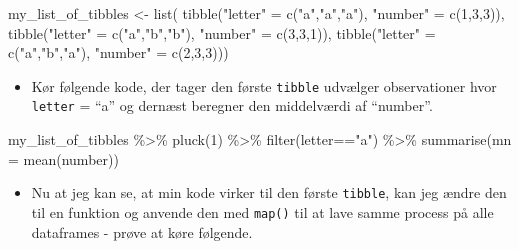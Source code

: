 \documentclass[
]{book}
\newenvironment{Shaded}{\begin{snugshade}}{\end{snugshade}}
\newcommand{\AttributeTok}[1]{\textcolor[rgb]{0.77,0.63,0.00}{#1}}
\newcommand{\DecValTok}[1]{\textcolor[rgb]{0.00,0.00,0.81}{#1}}
\newcommand{\FunctionTok}[1]{\textcolor[rgb]{0.00,0.00,0.00}{#1}}
\newcommand{\NormalTok}[1]{#1}
\newcommand{\OtherTok}[1]{\textcolor[rgb]{0.56,0.35,0.01}{#1}}
\newcommand{\SpecialCharTok}[1]{\textcolor[rgb]{0.00,0.00,0.00}{#1}}
\newcommand{\StringTok}[1]{\textcolor[rgb]{0.31,0.60,0.02}{#1}}
\providecommand{\tightlist}{%
  \setlength{\itemsep}{0pt}\setlength{\parskip}{0pt}}
\begin{document}
\begin{Shaded}
\begin{Highlighting}[]
\NormalTok{my\_list\_of\_tibbles }\OtherTok{\textless{}{-}} \FunctionTok{list}\NormalTok{( }\FunctionTok{tibble}\NormalTok{(}\StringTok{"letter"} \OtherTok{=} \FunctionTok{c}\NormalTok{(}\StringTok{"a"}\NormalTok{,}\StringTok{"a"}\NormalTok{,}\StringTok{"a"}\NormalTok{), }\StringTok{"number"} \OtherTok{=} \FunctionTok{c}\NormalTok{(}\DecValTok{1}\NormalTok{,}\DecValTok{3}\NormalTok{,}\DecValTok{3}\NormalTok{)),}
                            \FunctionTok{tibble}\NormalTok{(}\StringTok{"letter"} \OtherTok{=} \FunctionTok{c}\NormalTok{(}\StringTok{"a"}\NormalTok{,}\StringTok{"b"}\NormalTok{,}\StringTok{"b"}\NormalTok{), }\StringTok{"number"} \OtherTok{=} \FunctionTok{c}\NormalTok{(}\DecValTok{3}\NormalTok{,}\DecValTok{3}\NormalTok{,}\DecValTok{1}\NormalTok{)),}
                            \FunctionTok{tibble}\NormalTok{(}\StringTok{"letter"} \OtherTok{=} \FunctionTok{c}\NormalTok{(}\StringTok{"a"}\NormalTok{,}\StringTok{"b"}\NormalTok{,}\StringTok{"a"}\NormalTok{), }\StringTok{"number"} \OtherTok{=} \FunctionTok{c}\NormalTok{(}\DecValTok{2}\NormalTok{,}\DecValTok{3}\NormalTok{,}\DecValTok{3}\NormalTok{)))}
\end{Highlighting}
\end{Shaded}

\begin{itemize}
\tightlist
\item
  Kør følgende kode, der tager den første \texttt{tibble} udvælger observationer hvor \texttt{letter} = ``a'' og dernæst beregner den middelværdi af ``number''.
\end{itemize}

\begin{Shaded}
\begin{Highlighting}[]
\NormalTok{my\_list\_of\_tibbles }\SpecialCharTok{\%\textgreater{}\%} \FunctionTok{pluck}\NormalTok{(}\DecValTok{1}\NormalTok{) }\SpecialCharTok{\%\textgreater{}\%} \FunctionTok{filter}\NormalTok{(letter}\SpecialCharTok{==}\StringTok{"a"}\NormalTok{) }\SpecialCharTok{\%\textgreater{}\%} \FunctionTok{summarise}\NormalTok{(}\AttributeTok{mn =} \FunctionTok{mean}\NormalTok{(number))}
\end{Highlighting}
\end{Shaded}

\begin{itemize}
\tightlist
\item
  Nu at jeg kan se, at min kode virker til den første \texttt{tibble}, kan jeg ændre den til en funktion og anvende den med \texttt{map()} til at lave samme process på alle dataframes - prøve at køre følgende.
\end{itemize}
\end{document}
